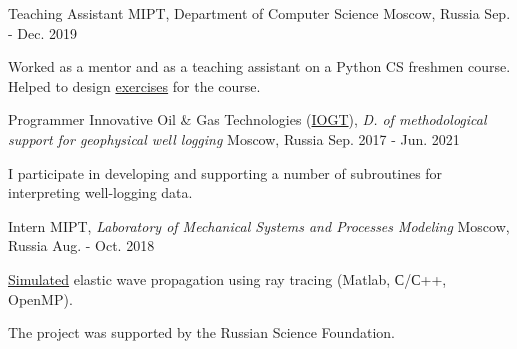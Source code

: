 \begin{cventries}

  \cventry
    {Teaching Assistant} %
    {MIPT, \hspace{5pt} Department of Computer Science} %
    {Moscow, Russia} %
    {Sep. - Dec. 2019} %
    {
      \begin{cvitems} %
        \item {Worked as a mentor and as a teaching assistant on a Python CS freshmen course. Helped to design \href{http://cs.mipt.ru/python}{exercises} for the course.}
      \end{cvitems}
    }
    

  \cventry
    {Programmer} %
    {Innovative Oil \& Gas Technologies (\href{http://www.iogt.ru/eng/}{IOGT}), \textit{D. of methodological support for geophysical well logging}} %
    {Moscow, Russia} %
    {Sep. 2017 - Jun. 2021} %
    {
      \begin{cvitems} %
        \item {I participate in developing and supporting a number of subroutines for interpreting well-logging data.}
      \end{cvitems}
    }


  \cventry
    {Intern} %
    {MIPT, \hspace{5pt} \textit{Laboratory of Mechanical Systems and Processes Modeling}} %
    {Moscow, Russia} %
    {Aug. - Oct. 2018} %
    {
      \begin{cvitems} %
        \item {\href{https://github.com/PolyachenkoYA/geo}{Simulated} elastic wave propagation using ray tracing (Matlab, С/С++, OpenMP).}
        \item {The project was supported by the Russian Science Foundation.}
      \end{cvitems}
    }

\end{cventries}
